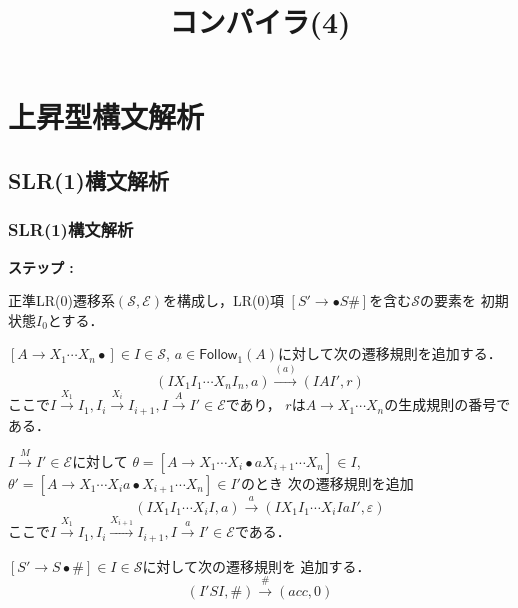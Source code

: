 \documentclass[dvipdfmx,cjk]{beamer}
\title{コンパイラ(4)}
\date{\lecturedate}
\newcounter{coffee}
\begin{document}
\frame{\titlepage}

\section{上昇型構文解析}

\subsection{SLR(1)構文解析}

\begin{frame}
  \frametitle{SLR(1)構文解析}
  {\small
    \setlength{\abovedisplayskip}{2pt}
    \setlength{\belowdisplayskip}{2pt}
    \begin{list}{{\rm\bf ステップ :}}{\setlength{\itemsep}{1pt}\setlength{\parsep}{0pt}}
      \item 正準LR(0)遷移系$(\mathcal{S},\mathcal{E})$を構成し，LR(0)項
            $[S'\rightarrow\bullet S\texttt{\#}]$を含む$\mathcal{S}$の要素を
            初期状態$I_0$とする．
      \item[{\bf ステップ2':}] $[A\rightarrow X_1\cdots X_n\bullet]\in I\in\mathcal{S}$,
            $a\in\mathsf{Follow}_1(A)$に対して次の遷移規則を追加する．
            \[(IX_1I_1\cdots X_nI_n,a)\xrightarrow{(a)}(IAI',r)\]
            ここで$I\xrightarrow{X_1}I_1,I_i\xrightarrow{X_i}I_{i+1},I\xrightarrow{A}I'\in\mathcal{E}$であり，
            $r$は$A\rightarrow X_1\cdots X_n$の生成規則の番号である．
            \addtocounter{coffee}{1}
      \item $I\xrightarrow{M}I'\in\mathcal{E}$に対して
            $\theta=[A\rightarrow X_1\cdots X_i\bullet a X_{i+1}\cdots X_n]\in I$,
            $\theta'=[A\rightarrow X_1\cdots X_i a\bullet X_{i+1}\cdots X_n]\in I'$のとき
            次の遷移規則を追加
            \[(IX_1I_1\cdots X_iI,a)\xrightarrow{a}(IX_1I_1\cdots X_iIaI',\varepsilon)\]
            ここで$I\xrightarrow{X_1}I_1,I_i\xrightarrow{X_{i+1}}I_{i+1},I\xrightarrow{a}I'\in\mathcal{E}$である．
      \item $[S'\rightarrow S\bullet\texttt{\#}]\in I\in\mathcal{S}$に対して次の遷移規則を
            追加する．
            \[(I'SI,\texttt{\#})\xrightarrow{\texttt{\#}}(acc,0)\]
    \end{list}
  }
\end{frame}
\end{document}
